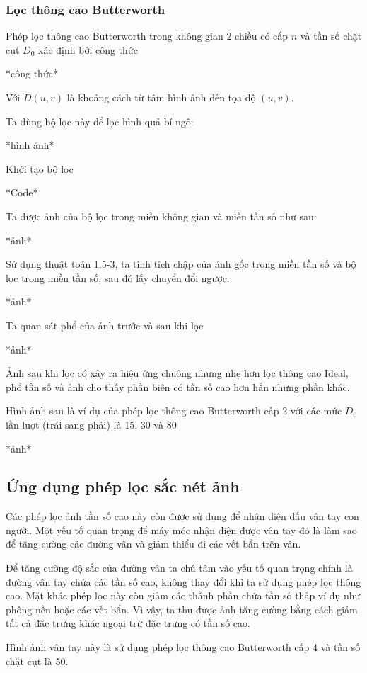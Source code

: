 \documentclass[12pt,a4paper]{report}
\numberwithin{equation}{section}
\theoremstyle{definition} %
\begin{document}
\subsubsection{Lọc thông cao Butterworth}



Phép lọc thông cao Butterworth trong không gian 2 chiều có cấp $n$ và tần số chặt cụt $D_0$ xác định bởi công thức

*công thức*

Với $D(u,v)$ là khoảng cách từ tâm hình ảnh đến tọa độ $(u,v)$.

Ta dùng bộ lọc này để lọc hình quả bí ngô:

*hình ảnh*

Khởi tạo bộ lọc

*Code*

Ta được ảnh của bộ lọc trong miền không gian và miền tần số như sau:

*ảnh*

Sử dụng thuật toán 1.5-3, ta tính tích chập của ảnh gốc trong miền tần số và bộ lọc trong miền tần số, sau đó lấy chuyển đổi ngược. 

*ảnh*

Ta quan sát phổ của ảnh trước và sau khi lọc

*ảnh*

Ảnh sau khi lọc có xảy ra hiệu ứng chuông nhưng nhẹ hơn lọc thông cao Ideal, phổ tần số và ảnh cho thấy phần biên có tần số cao hơn hẳn những phần khác.

Hình ảnh sau là ví dụ của phép lọc thông cao Butterworth cấp 2 với các mức $D_0$ lần lượt (trái sang phải) là 15, 30 và 80

*ảnh*
\subsection{Ứng dụng phép lọc sắc nét ảnh}
Các phép lọc ảnh tần số cao này còn được sử dụng để nhận diện dấu vân tay con người. Một yếu tố quan trọng để máy móc nhận diện được vân tay đó là làm sao để tăng cường các đường vân và giảm thiểu đi các vết bẩn trên vân. 

Để tăng cường độ sắc của đường vân ta chú tâm vào yếu tố quan trọng chính là đường vân tay chứa các tần số cao, không thay đổi khi ta sử dụng phép lọc thông cao. Mặt khác phép lọc này còn giảm các thầnh phần chứa tần số thấp ví dụ như phông nền hoặc các vết bẩn. Vì vậy, ta thu được ảnh tăng cường bằng cách giảm tất cả đặc trưng khác ngoại trừ đặc trưng có tần số cao.

Hình ảnh vân tay này là sử dụng phép lọc thông cao Butterworth cấp 4 và tần số chặt cụt là 50.
\end{document}
